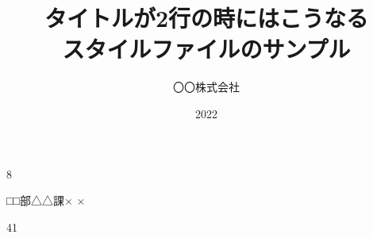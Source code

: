 \documentclass[a4paper, 14pt]{jreport}
\begin{document}

\begin{toppage}


  \title{タイトルが2行の時にはこうなる\\スタイルファイルのサンプル}{}{8}


  \author{〇〇株式会社}{□□部△△課}{× ×}

  \date{2022}{4}{1}

\end{toppage}

\contents
{}







\end{document}
